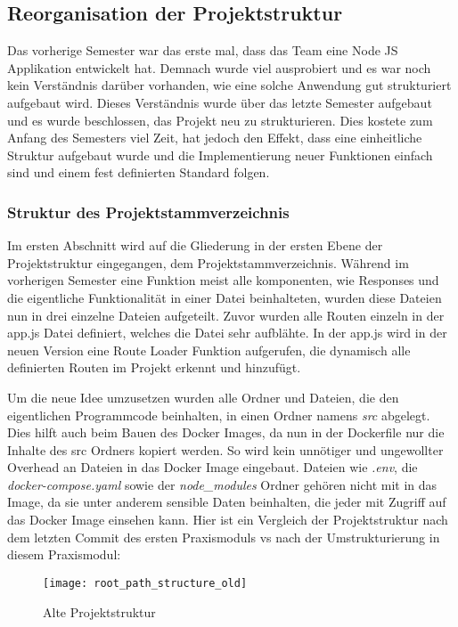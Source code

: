 \subsection{Reorganisation der Projektstruktur}\label{subsec:subsection-two-one}

Das vorherige Semester war das erste mal, dass das Team eine Node JS Applikation entwickelt hat.
Demnach wurde viel ausprobiert und es war noch kein Verständnis darüber vorhanden, wie eine solche Anwendung gut strukturiert aufgebaut wird.
Dieses Verständnis wurde über das letzte Semester aufgebaut und es wurde beschlossen, das Projekt neu zu strukturieren.
Dies kostete zum Anfang des Semesters viel Zeit, hat jedoch den Effekt, dass eine einheitliche Struktur aufgebaut wurde und die Implementierung neuer Funktionen einfach sind und einem fest definierten Standard folgen.

\subsubsection{Struktur des Projektstammverzeichnis}
Im ersten Abschnitt wird auf die Gliederung in der ersten Ebene der Projektstruktur eingegangen, dem Projektstammverzeichnis.
Während im vorherigen Semester eine Funktion meist alle komponenten, wie Responses und die eigentliche Funktionalität in einer Datei beinhalteten, wurden diese Dateien nun in drei einzelne Dateien aufgeteilt.
Zuvor wurden alle Routen einzeln in der app.js Datei definiert, welches die Datei sehr aufblähte.
In der app.js wird in der neuen Version eine Route Loader Funktion aufgerufen, die dynamisch alle definierten Routen im Projekt erkennt und hinzufügt.

Um die neue Idee umzusetzen wurden alle Ordner und Dateien, die den eigentlichen Programmcode beinhalten, in einen Ordner namens \textit{src} abgelegt.
Dies hilft auch beim Bauen des Docker Images, da nun in der Dockerfile nur die Inhalte des src Ordners kopiert werden.
So wird kein unnötiger und ungewollter Overhead an Dateien in das Docker Image eingebaut.
Dateien wie \textit{.env}, die \textit{docker-compose.yaml} sowie der \textit{node\_modules} Ordner gehören nicht mit in das Image, da sie unter anderem sensible Daten beinhalten, die jeder mit Zugriff auf das Docker Image einsehen kann.
Hier ist ein Vergleich der Projektstruktur nach dem letzten Commit des ersten Praxismoduls vs nach der Umstrukturierung in diesem Praxismodul:
\begin{figure}[h]
  \centering
  \texttt{[image: root\_path\_structure\_old]}
  \caption{Alte Projektstruktur}
  \label{fig:root_path_structure_old}
\end{figure}

